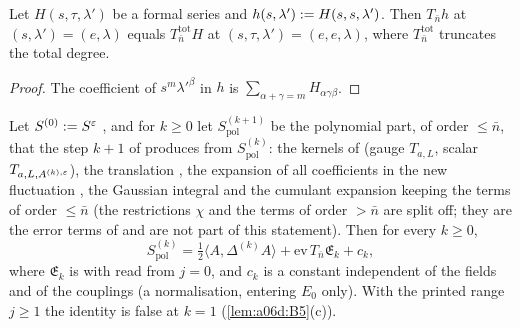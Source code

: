 \begin{lemma}\label{lem:a06d:B7}
Let $H(s,\tau,\lambda')$ be a formal series and $h(s,\lambda'):= H(s,s,\lambda')$. Then $T_{\bar n}h$ at $(s,\lambda')=(e,\lambda)$ equals $T^{\mathrm{tot}}_{\bar n}H$ at $(s,\tau,\lambda')=(e,e,\lambda)$, where $T^{\mathrm{tot}}_{\bar n}$ truncates the total degree.
\end{lemma}

\begin{proof}
The coefficient of $s^m\lambda'^\beta$ in $h$ is $\sum_{\alpha+\gamma=m}H_{\alpha\gamma\beta}$.
\end{proof}

\begin{theorem}\label{thm:a06d:B8}
Let $S^{(0)}:= S^{\varepsilon}$ \cite[(1.20)]{Ba3}, and for $k\ge0$ let $S^{(k+1)}_{\mathrm{pol}}$ be the polynomial part, of order $\le\bar n$, that the step $k+1$ of \cite[Sect.~3]{Ba1} produces from $S^{(k)}_{\mathrm{pol}}$: the kernels of \cite[(3.37)]{Ba1} (gauge $T_{a,L}$, scalar $T_{a,L,A^{(k),\varepsilon}}$), the translation \cite[(3.41)]{Ba1}, the expansion of all coefficients in the new fluctuation \cite[(3.44)]{Ba1}, the Gaussian integral and the cumulant expansion keeping the terms of order $\le\bar n$ (the restrictions $\chi$ and the terms of order $>\bar n$ are split off; they are the error terms of \cite[(3.26)]{Ba1} and are not part of this statement). Then for every $k\ge0$,
\[
S^{(k)}_{\mathrm{pol}}=\tfrac12\langle A,\Delta^{(k)}A\rangle+\mathrm{ev}\,T_{\bar n}\mathfrak E_k+c_k,
\]
where $\mathfrak E_k$ is \cite[(3.35)]{Ba1} with \cite[(3.34)]{Ba1} read from $j=0$, and $c_k$ is a constant independent of the fields and of the couplings (a normalisation, entering $E_0$ only). With the printed range $j\ge1$ the identity is false at $k=1$ (\cref{lem:a06d:B5}(c)).
\end{theorem}


